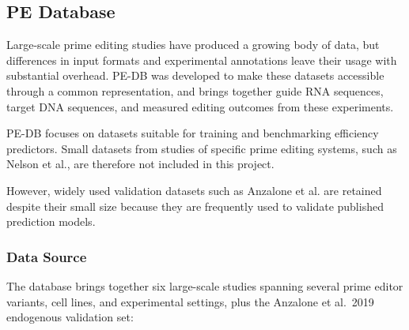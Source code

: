 \documentclass{article}
\begin{document}
\subsection{PE Database}

Large-scale prime editing studies have produced a growing body of data, but differences in input formats and experimental annotations leave their usage with substantial overhead. PE-DB was developed to make these datasets accessible through a common representation, and brings together guide RNA sequences, target DNA sequences, and measured editing outcomes from these experiments.

PE-DB focuses on datasets suitable for training and benchmarking efficiency predictors. Small datasets from studies of specific prime editing systems, such as Nelson et al.\cite{nelsonEngineeredPegRNAsImprove2022}, are therefore not included in this project.

However, widely used validation datasets such as Anzalone et al.\cite{anzaloneSearchandreplaceGenomeEditing2019} are retained despite their small size because they are frequently used to validate published prediction models.

\subsubsection{Data Source}

The database brings together six large-scale studies spanning several prime editor variants, cell lines, and experimental settings, plus the Anzalone et al.\ 2019 endogenous validation set:
\end{document}
